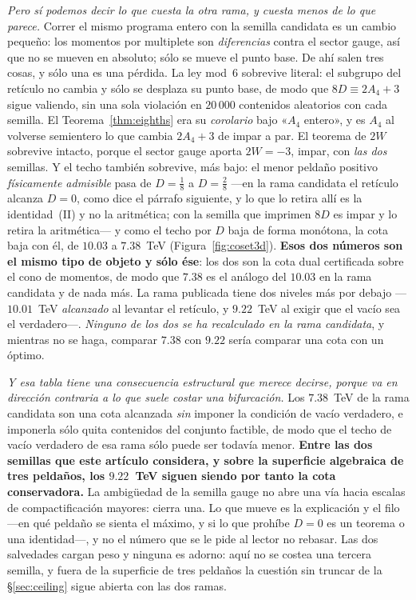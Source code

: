 \documentclass[11pt,a4paper]{article}
\begin{document}
\begin{itemize}
\emph{Pero sí podemos decir lo que cuesta la otra rama, y cuesta menos de lo que parece.} Correr el
mismo programa entero con la semilla candidata es un cambio pequeño: los momentos por multiplete
son \emph{diferencias} contra el sector gauge, así que no se mueven en absoluto; sólo se mueve el
punto base. De ahí salen tres cosas, y sólo una es una pérdida. La ley mod~$6$ sobrevive literal:
el subgrupo del retículo no cambia y sólo se desplaza su punto base, de modo que $8D\equiv 2A_4+3$
sigue valiendo, sin una sola violación en $20\,000$ contenidos aleatorios con cada semilla. El
Teorema~\ref{thm:eighths} era su \emph{corolario} bajo «$A_4$ entero», y es $A_4$ al volverse
semientero lo que cambia $2A_4+3$ de impar a par. El teorema de $2W$ sobrevive intacto, porque el
sector gauge aporta $2W=-3$, impar, con \emph{las dos} semillas. Y el techo también sobrevive, más
bajo: el menor peldaño positivo \emph{físicamente admisible} pasa de $D=\tfrac18$ a
$D=\tfrac28$ ---en la rama candidata el retículo alcanza $D=0$, como dice el párrafo siguiente, y
lo que lo retira allí es la identidad~(II) y no la aritmética; con la semilla que \cite{KM25}
imprimen $8D$ es impar y lo retira la aritmética--- y como el
techo por $D$ baja de forma monótona, la cota baja con él, de $10.03$ a $7.38$~TeV
(Figura~\ref{fig:coset3d}). \textbf{Esos dos números son el mismo tipo de objeto y sólo ése}: los
dos son la cota dual certificada sobre el cono de momentos, de modo que $7.38$ es el análogo del
$10.03$ en la rama candidata y de nada más. La rama publicada tiene dos niveles más por debajo
---$10.01$~TeV \emph{alcanzado} al levantar el retículo, y $9.22$~TeV al exigir que el vacío sea el
verdadero---. \emph{Ninguno de los dos se ha recalculado en la rama candidata}, y mientras no se
haga, comparar $7.38$ con $9.22$ sería comparar una cota con un óptimo.

\emph{Y esa tabla tiene una consecuencia estructural que merece decirse, porque va en dirección
contraria a lo que suele costar una bifurcación.} Los $7.38$~TeV de la rama candidata son una cota
alcanzada \emph{sin} imponer la condición de vacío verdadero, e imponerla sólo quita contenidos
del conjunto factible, de modo que el techo de vacío verdadero de esa rama sólo puede ser todavía
menor. \textbf{Entre las dos semillas que este artículo considera, y sobre la superficie
algebraica de tres peldaños, los $9.22$~TeV siguen siendo por tanto la cota conservadora.} La
ambigüedad de la semilla gauge no abre una vía hacia escalas de compactificación mayores: cierra
una. Lo que mueve es la explicación y el filo ---en qué peldaño se sienta el máximo, y si lo que
prohíbe $D=0$ es un teorema o una identidad---, y no el número que se le pide al lector no
rebasar. Las dos salvedades cargan peso y ninguna es adorno: aquí no se costea una tercera
semilla, y fuera de la superficie de tres peldaños la cuestión sin truncar de la
\S\ref{sec:ceiling} sigue abierta con las dos ramas.


\end{itemize}
\end{document}
